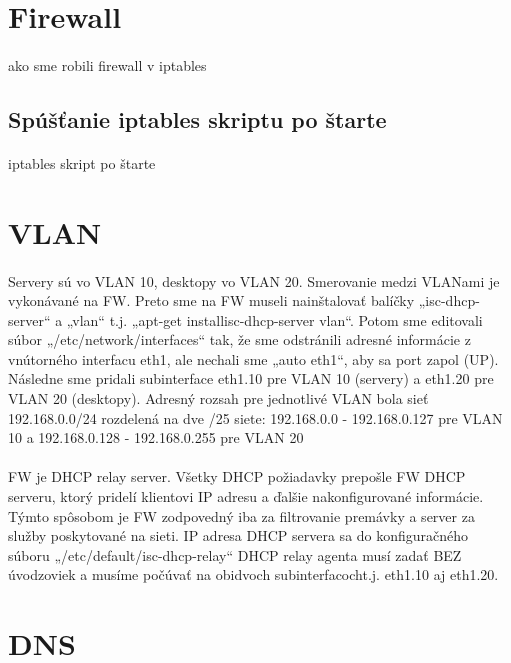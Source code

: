 \section{Firewall}
\paragraph{}
ako sme robili firewall v iptables

\subsection{Spúšťanie iptables skriptu po štarte}
\paragraph{}
iptables skript po štarte

\section{VLAN}
\paragraph{}
Servery sú vo VLAN 10, desktopy vo VLAN 20. Smerovanie medzi VLANami je vykonávané na FW. Preto sme na FW museli nainštalovať balíčky „isc-dhcp-server“ a „vlan“ t.j. „apt-get installisc-dhcp-server vlan“. Potom sme editovali súbor „/etc/network/interfaces“ tak, že sme odstránili adresné informácie z vnútorného interfacu eth1, ale nechali sme „auto eth1“, aby sa port zapol (UP). Následne sme pridali subinterface eth1.10 pre VLAN 10 (servery) a eth1.20 pre VLAN 20 (desktopy). Adresný rozsah pre jednotlivé VLAN bola sieť 192.168.0.0/24 rozdelená na dve /25 siete: 192.168.0.0 - 192.168.0.127 pre VLAN 10 a 192.168.0.128 - 192.168.0.255 pre VLAN 20
\paragraph{}
FW je DHCP relay server. Všetky DHCP požiadavky prepošle FW DHCP serveru, ktorý pridelí klientovi IP adresu a ďalšie nakonfigurované informácie. Týmto spôsobom je FW zodpovedný iba za filtrovanie premávky a server za služby poskytované na sieti.
IP adresa DHCP servera sa do konfiguračného súboru „/etc/default/isc-dhcp-relay“ DHCP relay agenta musí zadať BEZ úvodzoviek a musíme počúvať na obidvoch subinterfacocht.j. eth1.10 aj eth1.20.

\section{DNS}
